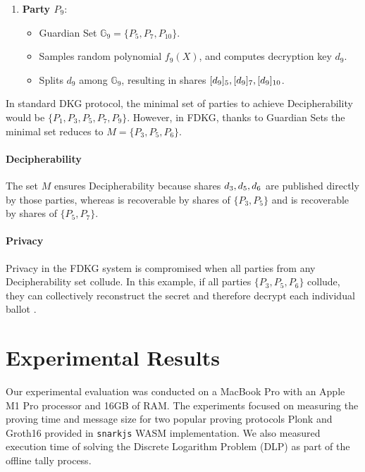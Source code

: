 \documentclass[runningheads]{llncs}
\begin{document}
\begin{enumerate}
    \item \textbf{Party $P_9$}:
    \begin{itemize}
        \item Guardian Set $\mathbb{G}_9 = \{P_5, P_7, P_{10}\}$.
        \item Samples random polynomial $f_9(X)$, and computes decryption key $d_9$.
        \item Splits $d_9$ among $\mathbb{G}_9$, resulting in shares $[d_{9}]_{5}, [d_{9}]_{7}, [d_{9}]_{10}$.
    \end{itemize}
\end{enumerate}

In standard DKG protocol, the minimal set of parties to achieve Decipherability would be \(\{P_1, P_3, P_5, P_7, P_9 \}\). However, in FDKG, thanks to Guardian Sets the minimal set reduces to \(M = \{P_3, P_5, P_6\}\).

\paragraph{Decipherability}
The set $M$ ensures Decipherability because shares $d_{3},d_{5},d_{6}$ are published directly by those parties, whereas  is recoverable by shares of \(\{P_3, P_5\}\) and  is recoverable by shares of \(\{P_5, P_7\}\).

\paragraph{Privacy}
Privacy in the FDKG system is compromised when all parties from any Decipherability set collude. In this example, if all parties \(\{P_3, P_5, P_6\}\) collude, they can collectively reconstruct the secret \DecryptionKey and therefore decrypt each individual ballot .

\section{Experimental Results}

Our experimental evaluation was conducted on a MacBook Pro with an Apple M1 Pro processor and 16GB of RAM. The experiments focused on measuring the proving time and message size for two popular proving protocols Plonk and Groth16 provided in \texttt{snarkjs}\cite{ProvingCircuitsZK,Iden3Snarkjs2023} WASM implementation. We also measured execution time of solving the Discrete Logarithm Problem (DLP) as part of the offline tally process.
\end{document}
